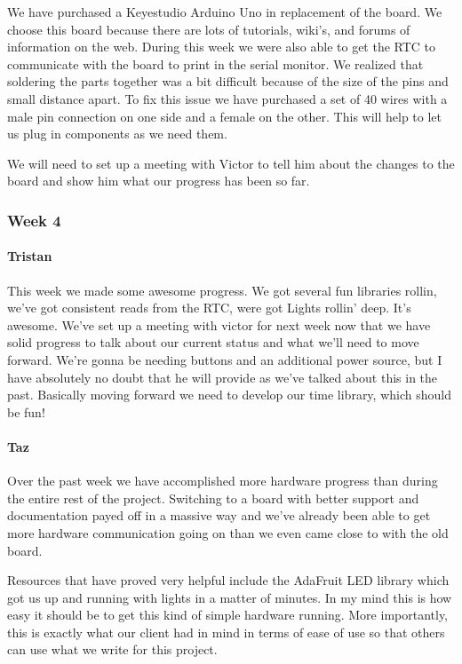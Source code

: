 \documentclass[onecolumn, draftclsnofoot,10pt, compsoc]{IEEEtran}
\begin{document}
We have purchased a Keyestudio Arduino Uno in replacement of the board. We choose this board because there are lots of tutorials, wiki's, and forums of information on the web. During this week we were also able to get the RTC to communicate with the board to print in the serial monitor. We realized that soldering the parts together was a bit difficult because of the size of the pins and small distance apart. To fix this issue we have purchased a set of 40 wires with a male pin connection on one side and a female on the other. This will help to let us plug in components as we need them.

We will need to set up a meeting with Victor to tell him about the changes to the board and show him what our progress has been so far.
\subsubsection{Week 4}
\paragraph{Tristan}
This week we made some awesome progress. We got several fun libraries rollin, we've got consistent reads from the RTC, were got Lights rollin' deep. It's awesome. We've set up a meeting with victor for next week now that we have solid progress to talk about our current status and what we'll need to move forward. We're gonna be needing buttons and an additional power source, but I have absolutely no doubt that he will provide as we've talked about this in the past. Basically moving forward we need to develop our time library, which should be fun!
\paragraph{Taz}
Over the past week we have accomplished more hardware progress than during the entire rest of the project. Switching to a board with better support and documentation payed off in a massive way and we've already been able to get more hardware communication going on than we even came close to with the old board.

Resources that have proved very helpful include the AdaFruit LED library which got us up and running with lights in a matter of minutes. In my mind this is how easy it should be to get this kind of simple hardware running. More importantly, this is exactly what our client had in mind in terms of ease of use so that others can use what we write for this project.
\end{document}
